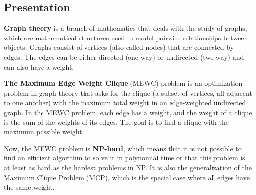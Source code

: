 \subsection{Presentation}

\textbf{Graph theory} is a branch of mathematics that deals with the study of graphs,
which are mathematical structures used to model pairwise relationships between
objects. Graphs consist of vertices (also called nodes) that are connected by
edges. The edges can be either directed (one-way) or undirected (two-way) and can
also have a weight. \newline

\textbf{The Maximum Edge Weight Clique} (MEWC) problem is an optimization problem
in graph theory that asks for the clique (a subset of vertices, all adjacent to
one another) with the maximum total weight in an edge-weighted undirected graph.
In the MEWC problem, each edge has a weight, and the weight of a clique is the
sum of the weights of its edges. The goal is to find a clique with the maximum
possible weight. \newline

Now, the MEWC problem is \textbf{NP-hard}, which means that it is not possible
to find an efficient algorithm to solve it in polynomial time or that this problem
is at least as hard as the hardest problems in NP. It is also the generalization
of the Maximum Clique Problem (MCP), which is the special case where all edges
have the same weight. \newline

